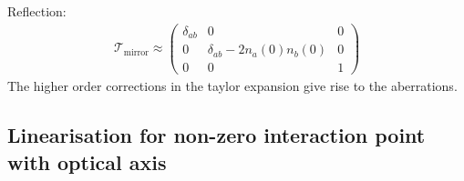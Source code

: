 \documentclass[12pt,a4paper,twoside,openright,BCOR10mm,headsepline,titlepage,abstracton,chapterprefix,final]{scrreprt}
\newcommand\Vector[1]{{\mathbf{#1}}}
\begin{document}
Reflection:
\begin{align}
  \mathcal{T}_{\text{mirror}} \approx \begin{pmatrix}
  \delta_{ab} & 0 & 0 \\
   0 & \delta_{ab} - 2 n_a(0) n_b(0)& 0\\
  0 & 0 & 1 
 \end{pmatrix}
\end{align}
The higher order corrections in the taylor expansion give rise to the aberrations.

\subsection{Linearisation for non-zero interaction point with optical axis}
\newcommand{\dqv}{\Delta \Vector{q}}
\newcommand{\dpv}{\Delta \Vector{p}}

\newcommand{\dqi}[1]{\Delta q_{#1}}
\newcommand{\dpi}[1]{\Delta p_{#1}}


\newcommand{\qnv}{\Vector{q}_0}
\newcommand{\pnv}{\Vector{p}_0}
\end{document}
